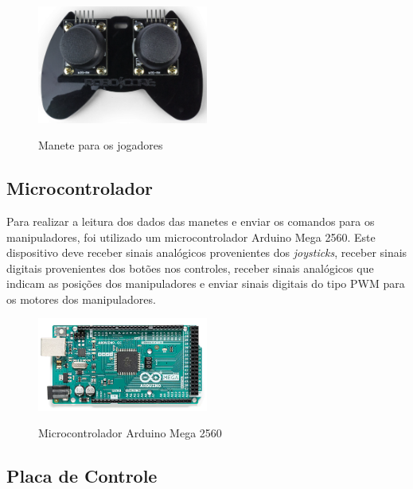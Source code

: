 \begin{figure}[H]
    \centering
    \caption{Manete para os jogadores}
    \includegraphics[keepaspectratio=true, width=0.5\textwidth]
    	{img/foto-controle-jogadores.png}
    \label{fig:fotoManeteJogadores}
\end{figure}

\subsection[Microcontrolador]{Microcontrolador}

Para realizar a leitura dos dados das manetes e enviar os comandos para os manipuladores, foi utilizado um microcontrolador Arduino Mega 2560.
Este dispositivo deve receber sinais analógicos provenientes dos \textit{joysticks}, receber sinais digitais provenientes dos botões nos controles, receber sinais analógicos que indicam as posições dos manipuladores e enviar sinais digitais do tipo PWM para os motores dos manipuladores.

\begin{figure}[H]
    \centering
    \caption{Microcontrolador Arduino Mega 2560}
    \includegraphics[keepaspectratio=true, width=0.5\textwidth]
    	{img/foto-arduino.png}
    \label{fig:fotoArduino}
\end{figure}

\subsection[Placa de Controle]{Placa de Controle}

